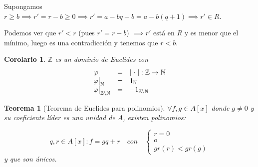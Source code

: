 \documentclass[11pt, a4paper, titlepage]{article}
\makeatletter
\renewenvironment{proof}[1][\proofname] {\vspace{-15pt}\par\pushQED{\qed}\normalfont\topsep6\p@\@plus6\p@\relax\trivlist\item[\hskip\labelsep\it#1\@addpunct{.}]\ignorespaces}{\popQED\endtrivlist\@endpefalse}
\providecommand{\ent}{\mathbb{Z}}
\providecommand{\nat}{\mathbb{N}}
\providecommand{\abs}[1]{\lvert#1\rvert}
\newcommand\restr[2]{{%
  \left.\kern-\nulldelimiterspace %
  #1 %
  \vphantom{\big|} %
  \right|_{#2} %
  }}
\theoremstyle{theorem-style}
\newtheorem*{nth}{Teorema}
\newtheorem{ncor}{Corolario}
\theoremstyle{definition-style}
\theoremstyle{remark-style}
\theoremstyle{example-style}
\makeatother
\begin{document}
\begin{proof}
\begin{itemize}
Supongamos $ r \geq b\implies r' = r-b \geq 0 \implies r' = a-bq -b = a -b(q+1)\implies r' \in R$.

Podemos ver que $r' < r$ (pues $r'=r-b$) $\implies  r'$ está en $R$ y es menor que el mínimo, luego es una contradicción y tenemos que $r < b$.

\end{itemize}




\end{proof}

\begin{ncor}
$\ent$ es un dominio de Euclides con
  \[
  \begin{array}{lll}
  \varphi & = & \abs{\;\cdot\;}: \ent \to \nat \\
  \restr{\varphi}{\nat} & = & 1_{\nat} \\
  \restr{\varphi}{\ent \setminus \nat} & = & -1_{\ent \setminus \nat}
\end{array}
\]
\end{ncor}

\begin{nth}[Teorema de Euclides para polinomios]
		$\forall f,g \in A[x]$ donde $g \neq 0 $ y su coeficiente líder es una unidad de $A$, existen polinomios:
	
	\[
	q,r \in A[x] : f = gq + r \quad con \quad
	 \begin{cases}
		r = 0\\
		o\\
		gr(r) < gr(g)
	\end{cases}
	\]
	y que son únicos.
\end{nth}
\end{document}
